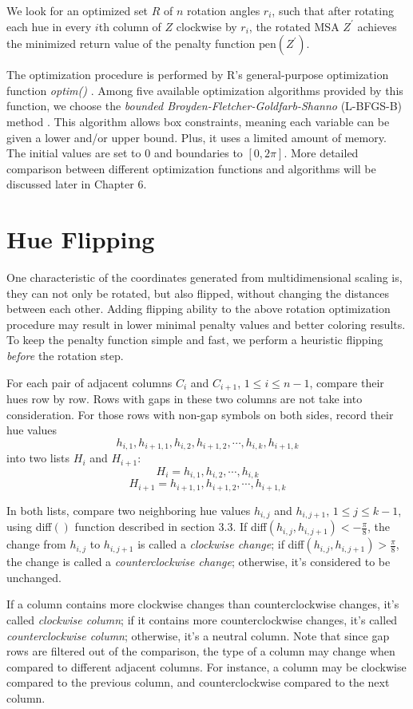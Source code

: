 We look for an optimized set $R$ of $n$ rotation angles $r_i$, such that after rotating each hue in every $i$th column of $Z$ clockwise by $r_i$, the rotated MSA $Z^\prime$ achieves the minimized return value of the penalty function $\mathrm{pen}(Z^\prime)$.

The optimization procedure is performed by R's general-purpose optimization function \emph{optim()} \cite{R2009aa}. Among five available optimization algorithms provided by this function, we choose the \emph{bounded Broyden-Fletcher-Goldfarb-Shanno} (L-BFGS-B) method \cite{Byrd:1995aa}. This algorithm allows box constraints, meaning each variable can be given a lower and/or upper bound. Plus, it uses a limited amount of memory. The initial values are set to 0 and boundaries to $[0, 2\pi]$. More detailed comparison between different optimization functions and algorithms will be discussed later in Chapter 6.

\section{Hue Flipping}

One characteristic of the coordinates generated from multidimensional scaling is, they can not only be rotated, but also flipped, without changing the distances between each other. Adding flipping ability to the above rotation optimization procedure may result in lower minimal penalty values and better coloring results. To keep the penalty function simple and fast, we perform a heuristic flipping \emph{before} the rotation step.

For each pair of adjacent columns $C_i$ and $C_{i+1}$, $1 \le i \le n-1$, compare their hues row by row. Rows with gaps in these two columns are not take into consideration. For those rows with non-gap symbols on both sides, record their hue values $$h_{i,1},h_{i+1,1},h_{i,2},h_{i+1,2},\cdots,h_{i,k},h_{i+1,k}$$ into two lists $H_i$ and $H_{i+1}$: $$H_i=h_{i,1},h_{i,2},\cdots,h_{i,k}$$ $$H_{i+1}=h_{i+1,1},h_{i+1,2},\cdots,h_{i+1,k}$$

In both lists, compare two neighboring hue values $h_{i,j}$ and $h_{i,j+1}$, $1\le j\le k-1$, using diff$()$ function described in section 3.3. If diff$(h_{i,j},h_{i,j+1})<-\frac{\pi}{8}$, the change from $h_{i,j}$ to $h_{i,j+1}$ is called a \emph{clockwise change}; if diff$(h_{i,j},h_{i,j+1})>\frac{\pi}{8}$, the change is called a \emph{counterclockwise change}; otherwise, it's considered to be unchanged.

If a column contains more clockwise changes than counterclockwise changes, it's called \emph{clockwise column}; if it contains more counterclockwise changes, it's called \emph{counterclockwise column}; otherwise, it's a neutral column. Note that since gap rows are filtered out of the comparison, the type of a column may change when compared to different adjacent columns. For instance, a column may be clockwise compared to the previous column, and counterclockwise compared to the next column.

